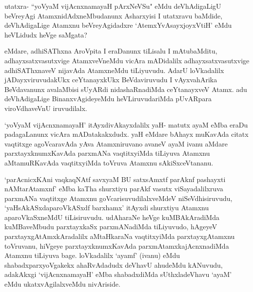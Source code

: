 \begin{artha}
utatxra- ``yoV\s yaM vijAcnxnamayaH pArxNeVSu" eMdu deVhAdigaLigU beVreyAgi AtamxnidAdxneMbudanunx Asharxyisi I utatxravu baMdide, deVhAdigaLige Atamxnu beVreyAgidadxre `AtemxYvAsayxjoyxVtiH' eMdu heVLidudx heVge saMgata?
\end{artha}

\begin{artha}%
eMdare, adhiSAThxna AroVpita I eraDanunx tiLisalu I mAtubaMditu, adhayxsatxvasutxvige AtamxveVneMdu vicAra mADidalilx adhayxsatxvasutxvige adhiSAThxnaveV nijavAda AtamxneMdu tiLiyuvudu. AdarU loVkadalilx jADayxviruvudakUkx ceYtanayxkUkx BeVdaviruvudu I vAyxvahArika BeVdavanunx avalaMbisi sUyARdi nidashaRnadiMda ceYtanayxveV Atamx. adu deVhAdigaLige BinanxvAgideyeMdu heVLiruvudariMda pUvARpara viroVdhaveVnU iruvudilalx. 
\end{artha}

\begin{artha}
`yoV\s yaM vijAcnxnamayaH' itAyxdivAkayxdalilx yaH- matutx ayaM eMba eraDu padagaLanunx vicAra mADatakakxdudx. yaH eMdare bAhayx muKavAda citatx vaqtitxge agoVcaravAda yAva Atamxniruvano avaneV ayaM ivanu aMdare parxtayxknumxKavAda parxmANa vaqtitxyiMda tiLiyuva Atamxnu aMtamuRKavAda vaqtitxyiMda toVruva Atamxnu sAkiSxceVtananu. 
\end{artha}

\begin{artha}
`parAcnicxKAni vaqkaqNAtf savxyaM BU satxsAmxtf parAknf pashayxti nAMtarAtamxnf' eMba kaTha shurxtiyu parAkf vasutx viSayadalilxruva parxmANa vaqtitxge Atamxnu goVcarisuvudilalxveMdeV niSeVdhisiruvudu, `yaHsAkASxdaparoVkASxdf barxhamx' itAyxdi shurxtiyu Atamxnu aparoVkaSxneMdU tiLisiruvudu. udAharaNe heVge kuMBAkAradiMda kuMBaveMbudu parxtayxkaSx parxmANadiMda tiLiyuvudo, hAgeyeV parxtayxgAtAmxkAradalilx aMtaHkaraNa vaqtitxyiMda parxtayxgAtamxnu toVruvanu, hiVgeye parxtayxknumxKavAda parxmAtamxkajAcnxnadiMda Atamxnu tiLiyuva bage. loVkadalilx `ayamf' (ivanu) eMdu shabadxparxyoVgakekx ahaRvAdadudx deVhavU ahudeMdu kANuvudu, adakAkxgi `vijAcnxnamayaH' eMba shabadxdiMda sUthxladeVhavu `ayaM' eMdu ukatxvAgilalxveMdu nivAriside.
\end{artha}


